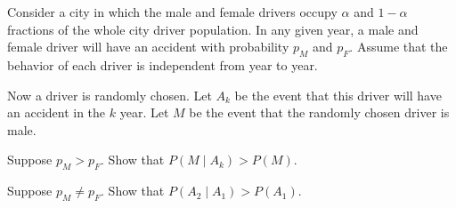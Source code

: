 \begin{problem}
  Consider a city in which the male and female drivers occupy \(\alpha\)
  and \(1-\alpha\) fractions of the whole city driver population.  In any
  given year, a male and female driver will have an accident with
  probability \(p_M\) and \(p_F\). Assume that the behavior of each driver
  is independent from year to year.

  Now a driver is randomly chosen. Let \(A_k\) be the event that this
  driver will have an accident in the \(k\) year. Let \(M\) be
  the event that the randomly chosen driver is male.
  \begin{alphlist}
  \item Suppose \(p_M>p_F\). Show that \(P(M\mid A_k)>P(M)\).
  \item Suppose \(p_M\neq p_F\). Show that \(P(A_2\mid A_1)>P(A_1)\).
  \end{alphlist}
\end{problem}
